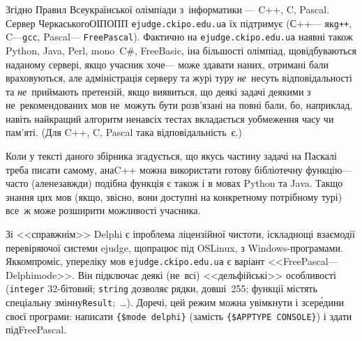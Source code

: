 Згідно Правил Всеукраїнської олімпіади з~інформатики --- C++, C, Pascal. Сервер Черкаського\nolinebreak[2] ОІПОПП \verb"ejudge.ckipo.edu.ua" їх підтримує (С++\nolinebreak[2] --- як\nolinebreak[3] \verb"g++", C\nolinebreak[3] ---\nolinebreak[2] \verb"gcc", Pascal\nolinebreak[3] --- \texttt{Free\nolinebreak[1] Pascal}). Фактично на \verb"ejudge.ckipo.edu.ua" наявні також Python, Java, Perl, mono~C\#, Free\nolinebreak[1] Basic, і\nolinebreak[3] на більшості олімпіад, що\nolinebreak[3] відбуваються на\nolinebreak[3] даному сервері, якщо учасник хоче\nolinebreak[3] --- може здавати на\nolinebreak[3] них, отримані бали враховуються, але адміністрація серверу та журі туру \emph{не}~несуть відповідальності та \emph{не}~приймають претензій, якщо виявиться, що деякі задачі деякими з не~рекомендованих мов не~можуть бути розв'язані на повні бали, бо, наприклад, навіть найкращий алгоритм не\nolinebreak[3] на\nolinebreak[3] всіх тестах вкладається у\nolinebreak[3] обмеження часу чи пам'яті. (Для C++, C, Pascal така відповідальність~є.)

Коли у тексті даного збірника згадується, що якусь частину задачі на Паскалі треба писати самому, а\nolinebreak[3] на\nolinebreak[3] C++ можна використати готову бібліотечну функцію\nolinebreak[3] --- часто (але\nolinebreak[3] не\nolinebreak[3] завжди) подібна функція є також і в мовах Python та Java. Так\nolinebreak[3] що знання цих мов (якщо, звісно, вони доступні на конкретному потрібному турі) все~ж може розширити можливості учасника.

\label{text:notes-about-delphi-mode} Зі <<справжнім>> Delphi є і\nolinebreak[3] проблема ліцензійної чистоти, і\nolinebreak[3] складнощі взаємодії  перевіряючої системи ejudge, що\nolinebreak[1] працює під OS\nolinebreak[3] Linux, з Windows-програмами.
Як\nolinebreak[3] компроміс, у\nolinebreak[3] переліку мов \verb"ejudge."\linebreak[0]\verb"ckipo."\linebreak[1]\verb"edu.ua" є варіант <<Free\nolinebreak[1] Pascal\nolinebreak[3] --- Delphi\nolinebreak[1] mode>>. Він підключає деякі (не~всі) <<дельфійські>> особливості (\verb"integer" 32-бітовий; \verb"string" дозволяє рядки, довші~255; функції містять спеціальну змінну\nolinebreak[2] \verb"Result";~\dots). До\nolinebreak[3] речі, цей режим %
можна увімкнути і зсер\'{е}\-дини своєї програми: написати \verb"{$mode delphi}" (замість \verb"{$APPTYPE CONSOLE}") і здати під\nolinebreak[1] Free\nolinebreak[1] Pascal.


